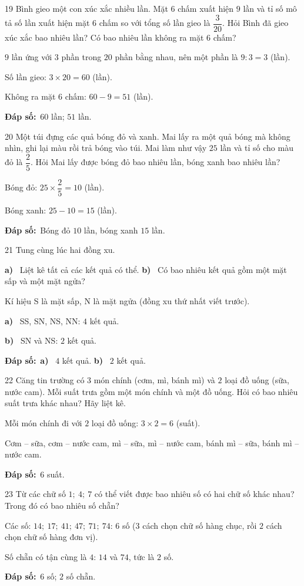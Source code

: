 \documentclass[11pt]{article}
\newif\ifsol \solfalse
\providecommand{\AnsWord}{Đáp số}
\newcommand{\dapso}[1]{\par\textbf{\AnsWord:}\ #1}
\newcommand{\probsol}[1]{%
  \begin{lrbox}{\solmeasure}\begin{minipage}{\dimexpr\linewidth-24pt\relax}#1\end{minipage}\end{lrbox}%
  \ifsol
    \begin{solbox}#1\end{solbox}%
  \else
    \setlength{\solht}{\dimexpr\ht\solmeasure+\dp\solmeasure+0.85cm\relax}%
    \ifdim\solht<1.35cm\setlength{\solht}{1.35cm}\fi
    \begin{tcolorbox}[colback=white,colframe=Line,boxrule=0.8pt,arc=5pt,
      left=8pt,right=8pt,top=4pt,bottom=4pt,height=\solht]{\footnotesize\color{Slate}\itshape\WorkWord}\end{tcolorbox}%
  \fi}
\newcommand{\pa}[1]{\textbf{#1)}\ }
\newcommand{\gap}{\vspace{0.3cm}}
\def\WorkWord{Bài làm:}
\def\AnsWord{Đáp số}
\begin{document}
\gap
\begin{probbox}{19}{\relax}
Bình gieo một con xúc xắc nhiều lần. Mặt $6$ chấm xuất hiện $9$ lần và tỉ số mô tả số lần xuất hiện mặt $6$ chấm so với tổng số lần gieo là $\dfrac{3}{20}$. Hỏi Bình đã gieo xúc xắc bao nhiêu lần? Có bao nhiêu lần không ra mặt $6$ chấm?
\end{probbox}
\probsol{
$9$ lần ứng với $3$ phần trong $20$ phần bằng nhau, nên một phần là $9:3=3$ (lần).\par Số lần gieo: $3\times20=60$ (lần).\par Không ra mặt $6$ chấm: $60-9=51$ (lần).
\dapso{$60$ lần; $51$ lần.}}
\gap
\begin{probbox}{20}{\relax}
Một túi đựng các quả bóng đỏ và xanh. Mai lấy ra một quả bóng mà không nhìn, ghi lại màu rồi trả bóng vào túi. Mai làm như vậy $25$ lần và tỉ số cho màu đỏ là $\dfrac25$. Hỏi Mai lấy được bóng đỏ bao nhiêu lần, bóng xanh bao nhiêu lần?
\end{probbox}
\probsol{
Bóng đỏ: $25\times\dfrac25=10$ (lần).\par Bóng xanh: $25-10=15$ (lần).
\dapso{Bóng đỏ $10$ lần, bóng xanh $15$ lần.}}
\gap
\begin{probbox}{21}{\relax}
Tung cùng lúc hai đồng xu.\par
\pa{a} Liệt kê tất cả các kết quả có thể. \quad \pa{b} Có bao nhiêu kết quả gồm một mặt sấp và một mặt ngửa?
\end{probbox}
\probsol{
Kí hiệu S là mặt sấp, N là mặt ngửa (đồng xu thứ nhất viết trước).\par
\pa{a} SS, SN, NS, NN: $4$ kết quả.\par
\pa{b} SN và NS: $2$ kết quả.
\dapso{\pa{a} $4$ kết quả. \pa{b} $2$ kết quả.}}
\gap
\begin{probbox}{22}{\relax}
Căng tin trường có $3$ món chính (cơm, mì, bánh mì) và $2$ loại đồ uống (sữa, nước cam). Mỗi suất trưa gồm một món chính và một đồ uống. Hỏi có bao nhiêu suất trưa khác nhau? Hãy liệt kê.
\end{probbox}
\probsol{
Mỗi món chính đi với $2$ loại đồ uống: $3\times2=6$ (suất).\par
Cơm -- sữa, cơm -- nước cam, mì -- sữa, mì -- nước cam, bánh mì -- sữa, bánh mì -- nước cam.
\dapso{$6$ suất.}}
\gap
\begin{probbox}{23}{\relax}
Từ các chữ số $1;\ 4;\ 7$ có thể viết được bao nhiêu số có hai chữ số khác nhau? Trong đó có bao nhiêu số chẵn?
\end{probbox}
\probsol{
Các số: $14;\ 17;\ 41;\ 47;\ 71;\ 74$: $6$ số ($3$ cách chọn chữ số hàng chục, rồi $2$ cách chọn chữ số hàng đơn vị).\par
Số chẵn có tận cùng là $4$: $14$ và $74$, tức là $2$ số.
\dapso{$6$ số; $2$ số chẵn.}}
\end{document}
